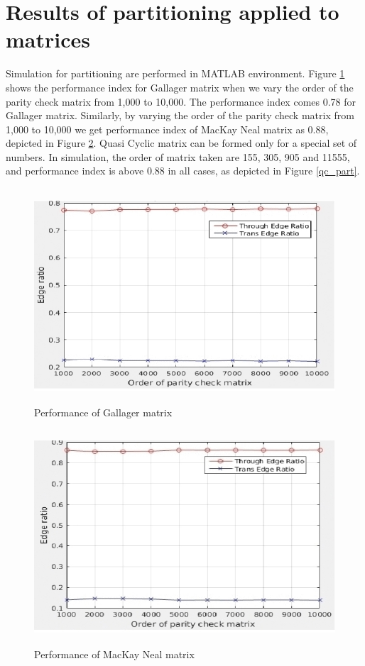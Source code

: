 \section{Results of partitioning applied to matrices}
Simulation for partitioning are performed in MATLAB environment. Figure \ref{gallager_part} shows the performance index for Gallager matrix when we vary the order of the parity check matrix from 1,000 to 10,000. The performance index comes 0.78 for Gallager matrix. Similarly, by varying the order of the parity check matrix from 1,000 to 10,000 we get performance index of MacKay Neal matrix as 0.88, depicted in Figure \ref{makey_part}. Quasi Cyclic matrix can be formed only for a special set of numbers. In simulation, the order of matrix taken are 155, 305, 905 and 11555,
and performance index is above 0.88 in all cases, as depicted in Figure \ref{qc_part}.

 \begin{figure}[h]
 \begin{center}
    \includegraphics[height=8cm,width=12cm]{gallager_part.jpg}
    \caption{Performance of Gallager matrix}
    \label{gallager_part} 
 \end{center}
\end{figure}   
 
  \begin{figure}[h]
 \begin{center}
    \includegraphics[height=8cm,width=12cm]{makey_part.jpg}
    \caption{Performance of MacKay Neal matrix} 
    \label{makey_part}
 \end{center}
\end{figure}


